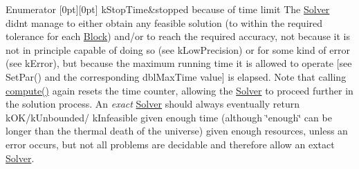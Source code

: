 \begin{DoxyEnumFields}{Enumerator}
[0pt][0pt]{}\mbox{\label{class_s_m_spp__di__unipi__it_1_1_solver_a2e0367580e249e8e6018c919bee5481da276958ff9ecda967369c9cec6b948463}} 
k\+Stop\+Time&stopped because of time limit The \mbox{\hyperlink{class_s_m_spp__di__unipi__it_1_1_solver}{Solver}} didn\textquotesingle{}t manage to either obtain any feasible solution (to within the required tolerance for each \mbox{\hyperlink{class_s_m_spp__di__unipi__it_1_1_block}{Block}}) and/or to reach the required accuracy, not because it is not in principle capable of doing so (see k\+Low\+Precision) or for some kind of error (see k\+Error), but because the maximum running time it is allowed to operate \mbox{[}see Set\+Par() and the corresponding dbl\+Max\+Time value\mbox{]} is elapsed. Note that calling \mbox{\hyperlink{class_s_m_spp__di__unipi__it_1_1_solver_a504d4e3e174c7a518cc66156a8a45ce5}{compute()}} again resets the time counter, allowing the \mbox{\hyperlink{class_s_m_spp__di__unipi__it_1_1_solver}{Solver}} to proceed further in the solution process. An {\itshape exact} \mbox{\hyperlink{class_s_m_spp__di__unipi__it_1_1_solver}{Solver}} should always eventually return k\+O\+K/k\+Unbounded/ k\+Infeasible given enough time (although \char`\"{}enough\char`\"{} can be longer than the thermal death of the universe) given enough resources, unless an error occurs, but not all problems are decidable and therefore allow an extact \mbox{\hyperlink{class_s_m_spp__di__unipi__it_1_1_solver}{Solver}}. \\
\hline


\end{DoxyEnumFields}
